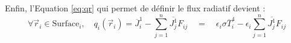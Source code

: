 Enfin, l'Equation \ref{eq:qr} qui permet de définir le flux radiatif devient :
\begin{equation}
    \forall \vec{r}_i \in \text{Surface}_i,\quad q_i(\vec{r}_i) =  \overline{J}_i^1  -  \sum_{j=1}^{n} \overline{J_j^1} F_{ij} \quad = \quad \epsilon_i \sigma \overline{T}^4_i  - \epsilon_i \sum_{j=1}^{n} \overline{J_j^1} F_{ij}
    \label{eq:nice_qr}
\end{equation}

